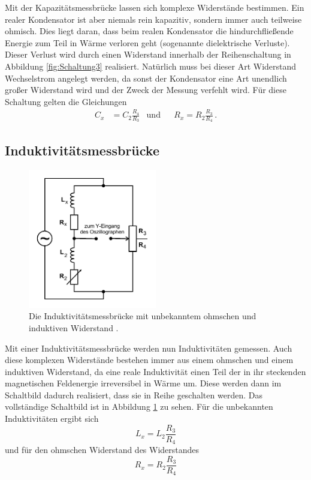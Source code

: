 Mit der Kapazitätsmessbrücke lassen sich komplexe Widerstände bestimmen. 
Ein realer Kondensator ist aber niemals rein kapazitiv, sondern immer auch teilweise ohmisch.
Dies liegt daran, dass beim realen Kondensator die hindurchfließende Energie zum Teil in Wärme verloren geht
(sogenannte dielektrische Verluste).
Dieser Verlust wird durch einen Widerstand innerhalb der Reihenschaltung in Abbildung \ref{fig:Schaltung3} realisiert.
Natürlich muss bei dieser Art Widerstand Wechselstrom angelegt werden, da sonst der Kondensator eine Art 
unendlich großer Widerstand wird und der Zweck der Messung verfehlt wird.
Für diese Schaltung gelten die Gleichungen
\begin{align*} 
    C_x &= C_2 \frac {R_4}{R_3} & \text{und} & &   R_x = R_2 \frac {R_3}{R_4} \, .
\end{align*}


\subsection{Induktivitätsmessbrücke}

\begin{figure}
    \centering
    \includegraphics[width=0.5\textwidth]{pictures/schaltung4.pdf}
    \caption{Die Induktivitätsmessbrücke mit unbekanntem ohmschen und induktiven Widerstand \cite[6]{v302}.}
    \label{fig:Schaltung4}
\end{figure}

Mit einer Induktivitätsmessbrücke werden nun Induktivitäten gemessen.
Auch diese komplexen Widerstände bestehen immer aus einem ohmschen und einem induktiven Widerstand,
da eine reale Induktivität einen Teil der in ihr steckenden magnetischen Feldenergie irreversibel in Wärme um.
Diese werden dann im Schaltbild dadurch realisiert, dass sie in Reihe geschalten werden.
Das vollständige Schaltbild ist in Abbildung \ref{fig:Schaltung4} zu sehen.
Für die unbekannten Induktivitäten ergibt sich
\begin{equation} \label{eq:L_x}
    L_x = L_2 \frac{R_3}{R_4}
\end{equation}
und für den ohmschen Widerstand des Widerstandes
\begin{equation} \label{eq:induktR_x}
    R_x = R_2 \frac{R_3}{R_4}
\end{equation}


